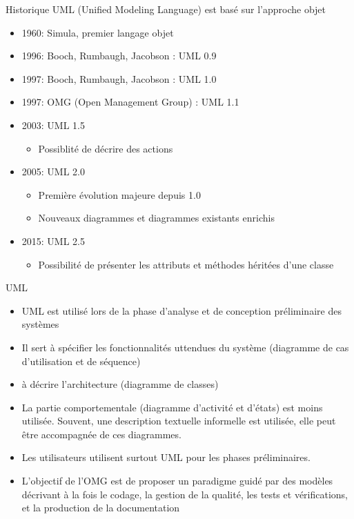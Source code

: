 \documentclass[14pt]{beamer}
\begin{document}
\begin{framentitle}{Historique}
    UML (Unified Modeling Language) est basé sur l'approche objet
    \begin{itemize}
        \item 1960: Simula, premier langage objet
        \item 1996: Booch, Rumbaugh, Jacobson : UML 0.9
        \item 1997: Booch, Rumbaugh, Jacobson : UML 1.0
        \item 1997: OMG (Open Management Group) : UML 1.1
        \item 2003: UML 1.5
            \begin{itemize}
                \item Possiblité de décrire des actions
            \end{itemize}
        \item 2005: UML 2.0
            \begin{itemize}
                \item Première évolution majeure depuis 1.0
                \item Nouveaux diagrammes et diagrammes existants enrichis
            \end{itemize}
        \item 2015: UML 2.5
            \begin{itemize}
                \item Possibilité de présenter les attributs et méthodes
                    héritées d'une classe
            \end{itemize}
    \end{itemize}
\end{framentitle}


\begin{framentitle}{UML}
    \begin{itemize}
        \item UML est utilisé lors de la phase d'analyse et de conception
            préliminaire des systèmes
        \item Il sert à spécifier les fonctionnalités uttendues du système
            (diagramme de cas d'utilisation et de séquence)
        \item à décrire l'architecture (diagramme de classes)
        \item La partie comportementale (diagramme d'activité et d'états) est
            moins utilisée. Souvent, une description textuelle informelle est
            utilisée, elle peut être accompagnée de ces diagrammes.
        \item Les utilisateurs utilisent surtout UML pour les phases
            préliminaires.
        \item L'objectif de l'OMG est de proposer un paradigme guidé par des
            modèles décrivant à la fois le codage, la gestion de la qualité, les
            tests et vérifications, et la production de la documentation
    \end{itemize}
\end{framentitle}
\end{document}
